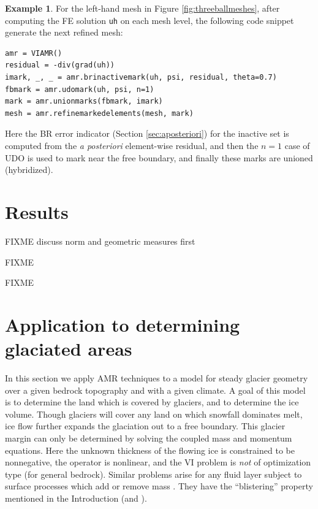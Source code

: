 \documentclass[]{interact}
\theoremstyle{plain}%
\theoremstyle{definition}
\newtheorem{example}[theorem]{Example}
\theoremstyle{remark}
\begin{document}
\begin{example} \label{example:hybrid}
For the left-hand mesh in Figure \ref{fig:threeballmeshes}, after computing the FE solution \texttt{uh} on each mesh level, the following code snippet generate the next refined mesh:
\begin{verbatim}
amr = VIAMR()
residual = -div(grad(uh))
imark, _, _ = amr.brinactivemark(uh, psi, residual, theta=0.7)
fbmark = amr.udomark(uh, psi, n=1)
mark = amr.unionmarks(fbmark, imark)
mesh = amr.refinemarkedelements(mesh, mark)
\end{verbatim}
Here the BR error indicator (Section \ref{sec:aposteriori}) for the inactive set is computed from the \emph{a posteriori} element-wise residual, and then the $n=1$ case of UDO is used to mark near the free boundary, and finally these marks are unioned (hybridized).
\end{example}



\section{Results} \label{sec:results}

FIXME discuss norm and geometric measures first

FIXME \cite{Kosub2016} \cite{JungeblutKleistMiltzow2022}

FIXME


\section{Application to determining glaciated areas} \label{sec:app}

In this section we apply AMR techniques to a model for steady glacier geometry over a given bedrock topography and with a given climate.  A goal of this model is to determine the land which is covered by glaciers, and to determine the ice volume.  Though glaciers will cover any land on which snowfall dominates melt, ice flow further expands the glaciation out to a free boundary.  This glacier margin can only be determined by solving the coupled mass and momentum equations.  Here the unknown thickness of the flowing ice is constrained to be nonnegative, the operator is nonlinear, and the VI problem is \emph{not} of optimization type (for general bedrock).  Similar problems arise for any fluid layer subject to surface processes which add or remove mass \cite{Bueler2021b}.  They have the ``blistering'' property mentioned in the Introduction (and \cite{JouvetBueler2012}).
\end{document}
